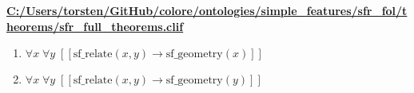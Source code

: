 \documentclass{article}
\begin{document}
\textbf{\url{C:/Users/torsten/GitHub/colore/ontologies/simple\_features/sfr\_fol/theorems/sfr\_full\_theorems.clif}}

\begin{enumerate}
\item $\forall x\; \forall y\;  \left[ \left[ \textrm{sf\_relate}(x,y) \rightarrow \textrm{sf\_geometry}(x) \right] \right]$
\item $\forall x\; \forall y\;  \left[ \left[ \textrm{sf\_relate}(x,y) \rightarrow \textrm{sf\_geometry}(y) \right] \right]$
\end{enumerate}
\end{document}
